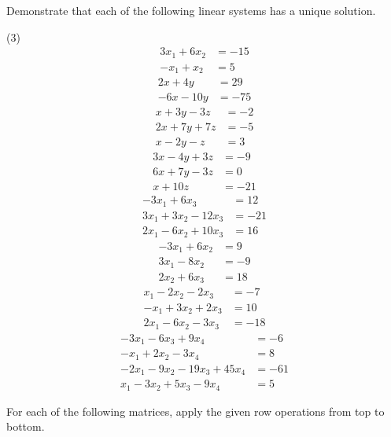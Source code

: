 Demonstrate that each of the following linear systems has a unique
solution.
\begin{tasks}[resume, style=enumerate](3)
\task
  \begin{align*}
    3 x_{1} + 6 x_{2} &= -15 \\
    - x_{1} + x_{2} &= 5
  \end{align*}
\task
  \begin{align*}
    2x + 4y &= 29 \\
    -6x - 10y &= -75
  \end{align*}
\task
  \begin{align*}
    x + 3y - 3z &= -2 \\
    2x + 7y + 7z &= -5 \\
    x - 2y - z &= 3
  \end{align*}
\task
  \begin{align*}
    3x - 4y + 3z &= -9 \\
    6x + 7y - 3z &= 0 \\
    x + 10z &= -21
\end{align*}
\task
  \begin{align*}
    - 3 x_{1} + 6 x_{3} &= 12 \\
    3 x_{1} + 3 x_{2} - 12 x_{3} &= -21 \\
    2 x_{1} - 6 x_{2} + 10 x_{3} &= 16
  \end{align*}
\task
  \begin{align*}
    - 3 x_{1} + 6 x_{2} &= 9 \\
    3 x_{1} - 8 x_{2} &= -9 \\
    2 x_{2} + 6 x_{3} &= 18
  \end{align*}
\task
  \begin{align*}
    x_{1} - 2x_{2} - 2x_{3} &= -7 \\
    -x_{1} + 3x_{2} + 2x_{3} &= 10 \\
    2x_{1} - 6x_{2} - 3x_{3} &= -18
  \end{align*}
\task
  \begin{align*}
    - 3 x_{1} - 6 x_{3} + 9 x_{4} &= -6 \\
    - x_{1} + 2 x_{2} - 3 x_{4} &= 8 \\
    - 2 x_{1} - 9 x_{2} - 19 x_{3} + 45 x_{4} &= -61 \\
    x_{1} - 3 x_{2} + 5 x_{3} - 9 x_{4} &= 5
  \end{align*}
\end{tasks}
For each of the following matrices, apply the given row operations
from top to bottom.
